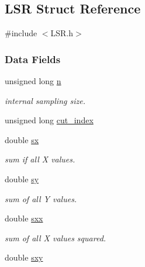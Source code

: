 \hypertarget{struct_l_s_r}{\subsection{L\+S\+R Struct Reference}
\label{struct_l_s_r}
}


{\ttfamily \#include $<$L\+S\+R.\+h$>$}

\subsubsection*{Data Fields}
\begin{DoxyCompactItemize}
\item 
\hypertarget{struct_l_s_r_a62054673f9ef1f1fedc9642feb1df2c0}{unsigned long \hyperlink{struct_l_s_r_a62054673f9ef1f1fedc9642feb1df2c0}{n}}\label{struct_l_s_r_a62054673f9ef1f1fedc9642feb1df2c0}

\begin{DoxyCompactList}\small\item\em internal sampling size. \end{DoxyCompactList}\item 
unsigned long \hyperlink{struct_l_s_r_ae625e50c2d72528752732fde73696e9c}{cut\+\_\+index}
\item 
\hypertarget{struct_l_s_r_afdc197570c735e7e9eab5ee065500090}{double \hyperlink{struct_l_s_r_afdc197570c735e7e9eab5ee065500090}{sx}}\label{struct_l_s_r_afdc197570c735e7e9eab5ee065500090}

\begin{DoxyCompactList}\small\item\em sum if all X values. \end{DoxyCompactList}\item 
\hypertarget{struct_l_s_r_a969933eb4ae8b2e39e355bf35e44fe42}{double \hyperlink{struct_l_s_r_a969933eb4ae8b2e39e355bf35e44fe42}{sy}}\label{struct_l_s_r_a969933eb4ae8b2e39e355bf35e44fe42}

\begin{DoxyCompactList}\small\item\em sum of all Y values. \end{DoxyCompactList}\item 
\hypertarget{struct_l_s_r_ade5139504701944a91ebee91d7df8de2}{double \hyperlink{struct_l_s_r_ade5139504701944a91ebee91d7df8de2}{sxx}}\label{struct_l_s_r_ade5139504701944a91ebee91d7df8de2}

\begin{DoxyCompactList}\small\item\em sum of all X values squared. \end{DoxyCompactList}\item 
\hypertarget{struct_l_s_r_a466bed83db1df94f12bd0dba5385d518}{double \hyperlink{struct_l_s_r_a466bed83db1df94f12bd0dba5385d518}{sxy}}\label{struct_l_s_r_a466bed83db1df94f12bd0dba5385d518}


\end{DoxyCompactItemize}
